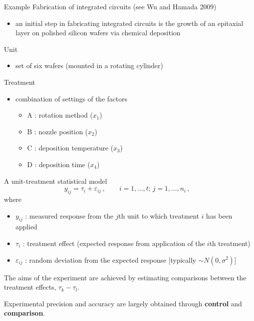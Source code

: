 \documentclass[
  ignorenonframetext,
]{beamer}
\providecommand{\tightlist}{%
  \setlength{\itemsep}{0pt}\setlength{\parskip}{0pt}}
\begin{document}
\begin{frame}{Example}
\protect\hypertarget{example}{}
Fabrication of integrated circuits (see Wu and Hamada 2009)

\begin{itemize}
\tightlist
\item
  an initial step in fabricating integrated circuits is the growth of an
  epitaxial layer on polished silicon wafers via chemical deposition
\end{itemize}

Unit

\begin{itemize}
\tightlist
\item
  set of six wafers (mounted in a rotating cylinder)
\end{itemize}

Treatment

\begin{itemize}
\tightlist
\item
  combination of settings of the factors

  \begin{itemize}
  \tightlist
  \item
    A : rotation method (\(x_1\))
  \item
    B : nozzle position (\(x_2\))
  \item
    C : deposition temperature (\(x_3\))
  \item
    D : deposition time (\(x_4\))
  \end{itemize}
\end{itemize}
\end{frame}

\begin{frame}{A unit-treatment statistical model}
\protect\hypertarget{a-unit-treatment-statistical-model}{}
\[
y_{ij} = \tau_i + \varepsilon_{ij}\,,\qquad i=1,\ldots,t;\,j=1,\ldots,n_i\,, 
\] where

\begin{itemize}
\item
  \(y_{ij}\) : measured response from the \(j\)th unit to which
  treatment \(i\) has been applied
\item
  \(\tau_i\) : treatment effect (expected response from application of
  the \(i\)th treatment)
\item
  \(\varepsilon_{ij}\) : random deviation from the expected response
  {[}typically \(\sim N(0,\sigma^2)\){]}
\end{itemize}

The aims of the experiment are achieved by estimating comparisons
between the treatment effects, \(\tau_k - \tau_l\).

Experimental precision and accuracy are largely obtained through
\textbf{control} and \textbf{comparison}.
\end{frame}
\end{document}
